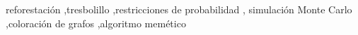 \documentclass[a4paper,fleqn]{cas-dc}
\theoremstyle{definition}
\begin{document}
\begin{keywords}
reforestación \sep tresbolillo \sep restricciones de probabilidad \sep
simulación Monte Carlo \sep coloración de grafos \sep algoritmo memético
\end{keywords}

\maketitle









\printbibliography
\end{document}
